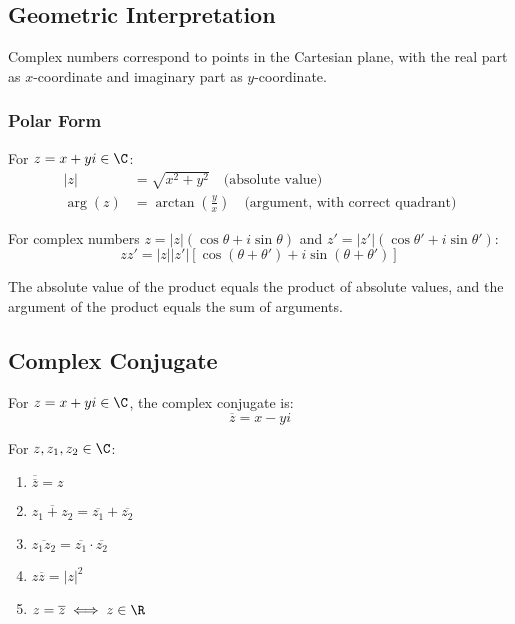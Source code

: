 \subsection{Geometric Interpretation}

Complex numbers correspond to points in the Cartesian plane, with the real part as $x$-coordinate and imaginary part as $y$-coordinate.

\subsubsection{Polar Form}

\begin{definition}\label{def:abs-arg}
    For $z = x + yi \in \C$:
    \begin{align}
        |z| &= \sqrt{x^2 + y^2} \quad \text{(absolute value)} \\
        \arg(z) &= \arctan\left(\frac{y}{x}\right) \quad \text{(argument, with correct quadrant)}
    \end{align}
\end{definition}

For complex numbers $z = |z|(\cos\theta + i\sin\theta)$ and $z' = |z'|(\cos\theta' + i\sin\theta')$:
\[
    zz' = |z||z'|[\cos(\theta + \theta') + i\sin(\theta + \theta')]
\]

The absolute value of the product equals the product of absolute values, and the argument of the product equals the sum of arguments.


\subsection{Complex Conjugate}
\begin{definition}\label{def:conjugate}
    For $z = x + yi \in \C$, the complex conjugate is:
    \[
        \overline{z} = x - yi
    \]
\end{definition}

\begin{theorem}\label{thm:conjugate-props}
    For $z, z_1, z_2 \in \C$:
    \begin{enumerate}[label=(\roman*)]
        \item $\overline{\overline{z}} = z$
        \item $\overline{z_1 + z_2} = \overline{z_1} + \overline{z_2}$
        \item $\overline{z_1 z_2} = \overline{z_1} \cdot \overline{z_2}$
        \item $z\overline{z} = |z|^2$
        \item $z = \overline{z} \iff z \in \R$
    \end{enumerate}
\end{theorem}

